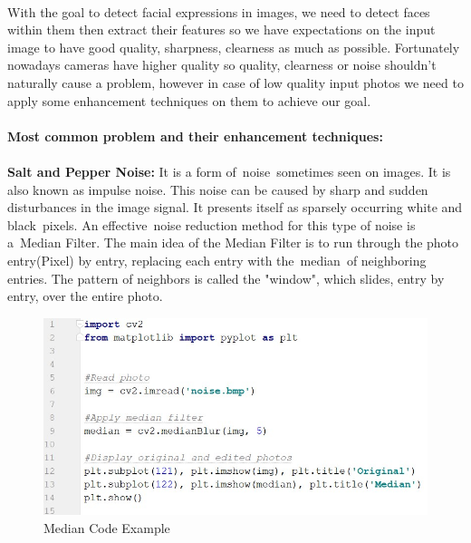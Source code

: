 \paragraph{}
With the goal to detect facial expressions in images, we need to detect faces within them then extract their features so we have expectations on the input image to have good quality, sharpness, clearness as much as possible.\newline
Fortunately nowadays cameras have higher quality so quality, clearness or noise shouldn’t naturally cause a problem, however in case of low quality input photos we need to apply some enhancement techniques on them to achieve our goal.

\paragraph{}
\textbf{Most common problem and their enhancement techniques:}\newline

\paragraph{}
\textbf{Salt and Pepper Noise:}\newline
It is a form of noise sometimes seen on images. It is also known as impulse noise. This noise can be caused by sharp and sudden disturbances in the image signal. It presents itself as sparsely occurring white and black pixels.\newline
An effective noise reduction method for this type of noise is a Median Filter.\newline
The main idea of the Median Filter is to run through the photo entry(Pixel) by entry, replacing each entry with the median of neighboring entries. The pattern of neighbors is called the "window", which slides, entry by entry, over the entire photo.

\begin{figure}[H]
	\centering
	\includegraphics[width=\linewidth]{images/median_code.jpg}
	\caption{Median Code Example}
\end{figure}

